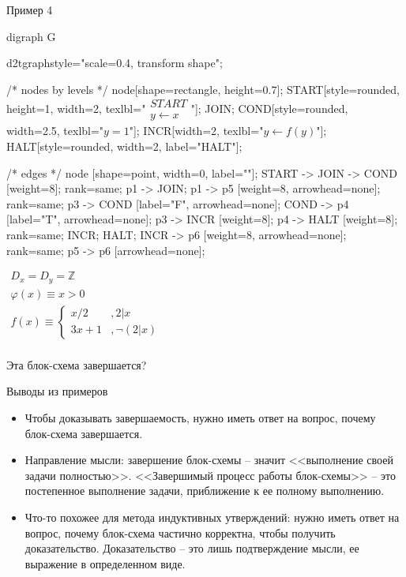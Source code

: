 \documentclass[hyperref={unicode=true}]{beamer}
\begin{document}
    \begin{frame}[fragile]{Пример 4}
    \begin{multicols}{2}
	\huge
	\begin{dot2tex}[options=-traw]
	digraph G{
		d2tgraphstyle="scale=0.4, transform shape";

		/* nodes by levels */
		node[shape=rectangle, height=0.7];
		START[style=rounded, height=1, width=2, texlbl="$\begin{matrix}START\\ y \leftarrow x\end{matrix}$"];
		JOIN;
        COND[style=rounded, width=2.5, texlbl="$y = 1$"];
		INCR[width=2, texlbl="$y \leftarrow f(y)$"];
        HALT[style=rounded, width=2, label="HALT"];

		/* edges */
		node [shape=point, width=0, label=""];
		START -> JOIN -> COND [weight=8];
		{ rank=same; p1 -> JOIN; }
		p1 -> p5 [weight=8, arrowhead=none];
		{ rank=same; p3 -> COND [label="F", arrowhead=none];
                     COND -> p4 [label="T", arrowhead=none]; }
		p3 -> INCR [weight=8];
		p4 -> HALT [weight=8];
		{ rank=same; INCR; HALT; }
		INCR -> p6 [weight=8, arrowhead=none];
		{ rank=same; p5 -> p6 [arrowhead=none]; }
        }
	\end{dot2tex}

	\normalsize

    $\begin{matrix}
    D_x = D_y = \mathbb{Z}\\
    \varphi(x) \equiv x > 0\\
    f(x) \equiv \begin{cases}x/2 &, 2|x\\
                             3x + 1 &, \neg(2|x)
                \end{cases}\\
    \end{matrix}$

    Эта блок-схема завершается?
    \end{multicols}
    \end{frame}

    \begin{frame}{Выводы из примеров}
    \begin{itemize}
    \item
    Чтобы доказывать завершаемость, нужно иметь ответ на вопрос,
    почему блок-схема завершается.
    \item
    Направление мысли: завершение блок-схемы -- значит <<выполнение
    своей задачи полностью>>. <<Завершимый процесс работы блок-схемы>>
    -- это постепенное выполнение задачи, приближение к ее
    полному выполнению.
    \item
    Что-то похожее для метода индуктивных утверждений: нужно
    иметь ответ на вопрос, почему блок-схема частично корректна,
    чтобы получить доказательство. Доказательство -- это лишь
    подтверждение мысли, ее выражение в определенном виде.
    \end{itemize}
    \end{frame}
\end{document}
